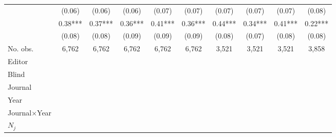 \begin{table}
\begin{threeparttable}
\begin{tabular}{p{3cm}S@{}S@{}S@{}S@{}S@{}S@{}S@{}S@{}S@{}}
                                          &      (0.06)   &      (0.06)   &      (0.06)   &      (0.07)   &      (0.07)   &      (0.07)   &      (0.07)   &      (0.07)   &      (0.08)   \\
               &        0.38***&        0.37***&        0.36***&        0.41***&        0.36***&        0.44***&        0.34***&        0.41***&        0.22***\\
                                          &      (0.08)   &      (0.08)   &      (0.09)   &      (0.09)   &      (0.09)   &      (0.08)   &      (0.07)   &      (0.08)   &      (0.08)   \\
            \midrule
            No. obs.                      &       6,762   &       6,762   &       6,762   &       6,762   &       6,762   &       3,521   &       3,521   &       3,521   &       3,858   \\
            \midrule
            Editor               &           {}   &           {}   &           {}   &           {}   &           {}   &           {}   &           {}   &           {}   &           {}   \\
            Blind                         &           {}   &           {}   &           {}   &           {}   &           {}   &           {}   &           {}   &           {}   &           {}   \\
            Journal                       &           {}   &           {}   &               &               &               &               &               &               &               \\
            Year                          &               &           {}   &               &               &               &               &               &               &               \\
            Journal\(\times\)Year                  &               &               &           {}   &           {}   &           {}   &           {}   &           {}   &           {}   &           {}   \\
            \(N_j\)                       &               &               &               &           {}   &           {}   &           {}   &           {}   &           {}   &           {}   \\

\end{tabular}
\end{threeparttable}
\end{table}
